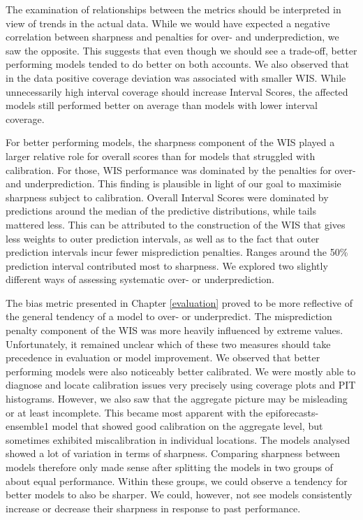 \documentclass[
]{book}
\begin{document}
The examination of relationships between the metrics should be interpreted in view of trends in the actual data. While we would have expected a negative correlation between sharpness and penalties for over- and underprediction, we saw the opposite. This suggests that even though we should see a trade-off, better performing models tended to do better on both accounts. We also observed that in the data positive coverage deviation was associated with smaller WIS. While unnecessarily high interval coverage should increase Interval Scores, the affected models still performed better on average than models with lower interval coverage.

For better performing models, the sharpness component of the WIS played a larger relative role for overall scores than for models that struggled with calibration. For those, WIS performance was dominated by the penalties for over- and underprediction. This finding is plausible in light of our goal to maximisie sharpness subject to calibration. Overall Interval Scores were dominated by predictions around the median of the predictive distributions, while tails mattered less. This can be attributed to the construction of the WIS that gives less weights to outer prediction intervals, as well as to the fact that outer prediction intervals incur fewer misprediction penalties. Ranges around the 50\% prediction interval contributed most to sharpness.
We explored two slightly different ways of assessing systematic over- or underprediction.

The bias metric presented in Chapter \ref{evaluation} proved to be more reflective of the general tendency of a model to over- or underpredict. The misprediction penalty component of the WIS was more heavily influenced by extreme values. Unfortunately, it remained unclear which of these two measures should take precedence in evaluation or model improvement. We observed that better performing models were also noticeably better calibrated. We were mostly able to diagnose and locate calibration issues very precisely using coverage plots and PIT histograms. However, we also saw that the aggregate picture may be misleading or at least incomplete. This became most apparent with the epiforecasts-ensemble1 model that showed good calibration on the aggregate level, but sometimes exhibited miscalibration in individual locations. The models analysed showed a lot of variation in terms of sharpness. Comparing sharpness between models therefore only made sense after splitting the models in two groups of about equal performance. Within these groups, we could observe a tendency for better models to also be sharper. We could, however, not see models consistently increase or decrease their sharpness in response to past performance.
\end{document}
